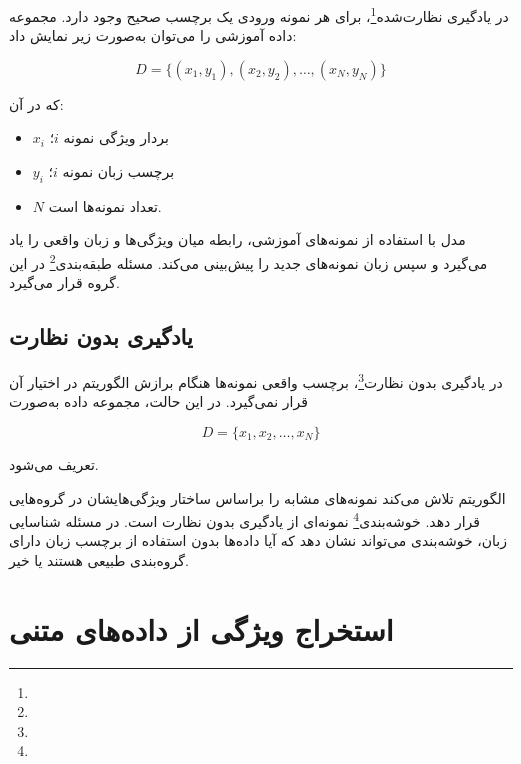 در یادگیری نظارت‌شده\footnote{}، برای هر نمونه ورودی یک برچسب صحیح وجود دارد. مجموعه داده آموزشی را می‌توان به‌صورت زیر نمایش داد:

\begin{equation}
D=
\{(x_1,y_1),(x_2,y_2),\ldots,(x_N,y_N)\}
\end{equation}

که در آن:

\begin{itemize}

	\item $x_i$ بردار ویژگی نمونه $i$؛

	\item $y_i$ برچسب زبان نمونه $i$؛

	\item $N$ تعداد نمونه‌ها است.

\end{itemize}

مدل با استفاده از نمونه‌های آموزشی، رابطه میان ویژگی‌ها و زبان واقعی را یاد می‌گیرد و سپس زبان نمونه‌های جدید را پیش‌بینی می‌کند. مسئله طبقه‌بندی\footnote{} در این گروه قرار می‌گیرد.


\subsection{یادگیری بدون نظارت}

در یادگیری بدون نظارت\footnote{}، برچسب واقعی نمونه‌ها هنگام برازش الگوریتم در اختیار آن قرار نمی‌گیرد. در این حالت، مجموعه داده به‌صورت

\begin{equation}
D=\{x_1,x_2,\ldots,x_N\}
\end{equation}

تعریف می‌شود.

الگوریتم تلاش می‌کند نمونه‌های مشابه را براساس ساختار ویژگی‌هایشان در گروه‌هایی قرار دهد. خوشه‌بندی\footnote{} نمونه‌ای از یادگیری بدون نظارت است. در مسئله شناسایی زبان، خوشه‌بندی می‌تواند نشان دهد که آیا داده‌ها بدون استفاده از برچسب زبان دارای گروه‌بندی طبیعی هستند یا خیر.


\section{استخراج ویژگی از داده‌های متنی}

